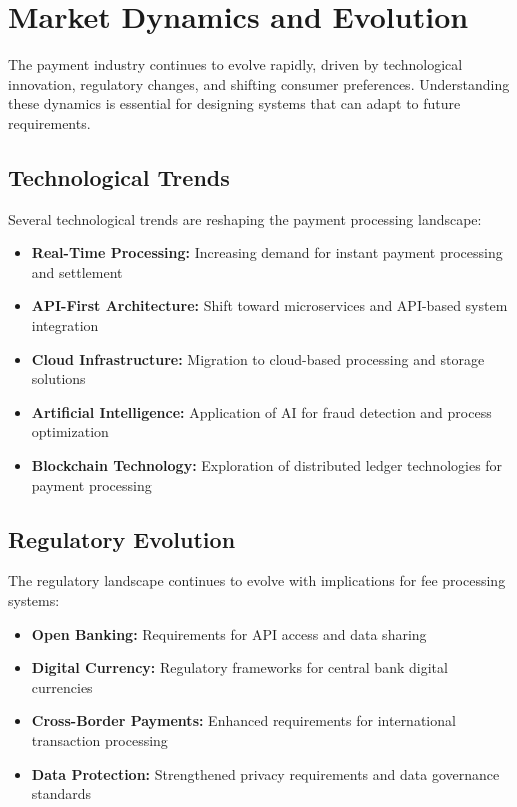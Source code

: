 \section{Market Dynamics and Evolution}

The payment industry continues to evolve rapidly, driven by technological innovation, regulatory changes, and shifting consumer preferences. Understanding these dynamics is essential for designing systems that can adapt to future requirements.

\subsection{Technological Trends}

Several technological trends are reshaping the payment processing landscape:

\begin{itemize}
    \item \textbf{Real-Time Processing:} Increasing demand for instant payment processing and settlement
    \item \textbf{API-First Architecture:} Shift toward microservices and API-based system integration
    \item \textbf{Cloud Infrastructure:} Migration to cloud-based processing and storage solutions
    \item \textbf{Artificial Intelligence:} Application of AI for fraud detection and process optimization
    \item \textbf{Blockchain Technology:} Exploration of distributed ledger technologies for payment processing
\end{itemize}

\subsection{Regulatory Evolution}

The regulatory landscape continues to evolve with implications for fee processing systems:

\begin{itemize}
    \item \textbf{Open Banking:} Requirements for API access and data sharing
    \item \textbf{Digital Currency:} Regulatory frameworks for central bank digital currencies
    \item \textbf{Cross-Border Payments:} Enhanced requirements for international transaction processing
    \item \textbf{Data Protection:} Strengthened privacy requirements and data governance standards
\end{itemize}


